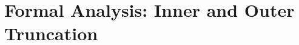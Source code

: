 \documentclass[12pt]{article}
\newtheorem{definition}[theorem]{Definition}
\newcommand{\Authornote}[3]{{\sf\footnotesize\color{#3}{[#1: #2]}}}
\newcommand{\Authornote}[3]{}
\newcommand{\jnote}[1]{\Authornote{Jeff}{#1}{blue}}
\begin{document}
%
%	
%	 
%	 
%	
%	
%	
%	
%	
%	
%	
%	
 
 
 

%


%


%


\section{Formal Analysis: Inner and Outer Truncation}\label{sec:formal-truncation}
\end{document}
